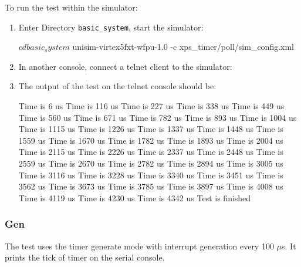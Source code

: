 \noindent To run the test within the simulator:
\begin{enumerate}
\item Enter Directory \texttt{basic\_system}, start the simulator:
\begin{script}
$ cd basic_system
$ unisim-virtex5fxt-wfpu-1.0 -c xps_timer/poll/sim_config.xml
\end{script}
\item In another console, connect a telnet client to the simulator:
\item The output of the test on the telnet console should be:
\begin{script}
Time is 6 us
Time is 116 us
Time is 227 us
Time is 338 us
Time is 449 us
Time is 560 us
Time is 671 us
Time is 782 us
Time is 893 us
Time is 1004 us
Time is 1115 us
Time is 1226 us
Time is 1337 us
Time is 1448 us
Time is 1559 us
Time is 1670 us
Time is 1782 us
Time is 1893 us
Time is 2004 us
Time is 2115 us
Time is 2226 us
Time is 2337 us
Time is 2448 us
Time is 2559 us
Time is 2670 us
Time is 2782 us
Time is 2894 us
Time is 3005 us
Time is 3116 us
Time is 3228 us
Time is 3340 us
Time is 3451 us
Time is 3562 us
Time is 3673 us
Time is 3785 us
Time is 3897 us
Time is 4008 us
Time is 4119 us                                                                                                                                                                                      
Time is 4230 us                                                                                                                                                                                      
Time is 4342 us                                                                                                                                                                                      
Test is finished                                                                                                                                                                                     \end{script}
\end{enumerate}

\subsubsection{Gen}

The test uses the timer generate mode with interrupt generation every 100 $\mu$s.
It prints the tick of timer on the serial console.

